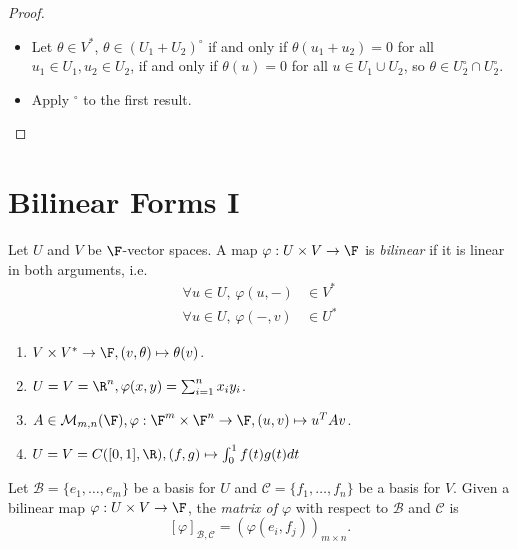 \documentclass[a4paper]{article}
\newcommand*{\ann}{\circ}
\newcommand*{\basis}{\mathcal}
\newcommand*{\M}{\mathcal{M}}
\theoremstyle{definition}
\begin{document}
\begin{proof}\leavevmode
  \begin{itemize}
  \item Let \(\theta \in V^*\), \(\theta \in (U_1+U_2)^\ann\) if and only if \(\theta(u_1+u_2) = 0\) for all \(u_1\in U_1, u_2 \in U_2\), if and only if \(\theta(u) = 0\) for all \(u \in U_1 \cup U_2\), so \(\theta\in U_2^\ann \cap U_2^\ann\).
  \item Apply \(^\ann\) to the first result.
  \end{itemize}
\end{proof}

\section{Bilinear Forms I}

\begin{definition}
  Let \(U\) and \(V\) be \(\F\)-vector spaces. A map \(\varphi: U \times V \to \F\) is \emph{bilinear} if it is linear in both arguments, i.e.
  \begin{align*}
    \forall u \in U, \, \varphi(u, -) &\in V^* \\
    \forall u \in U, \, \varphi(-, v) &\in U^*
  \end{align*}
\end{definition}

\begin{eg}\leavevmode
  \begin{enumerate}
  \item \(V \times V^* \to \F, (v, \theta) \mapsto \theta(v)\).
  \item \(U = V = \R^n, \varphi(x, y) = \sum_{i=1}^{n}x_iy_i\).
  \item \(A \in \M_{m,n}(\F), \varphi: \F^m \times \F^n \to \F, (u, v) \mapsto u^TAv\).
  \item \(U = V = C([0, 1], \R), (f, g) \mapsto \int_{0}^{1} f(t)g(t) dt \)
  \end{enumerate}
\end{eg}

\begin{definition}
  Let \(\basis B = \{e_1,\dots,e_m\}\) be a basis for \(U\) and \(\basis C = \{f_1,\dots,f_n\}\) be a basis for \(V\). Given a bilinear map \(\varphi: U \times V \to \F\), the \emph{matrix of \(\varphi\)} with respect to \(\basis B\) and \(\basis C\) is
  \[
    [\varphi]_{\basis B, \basis C} = \left( \varphi(e_i, f_j) \right)_{m \times n}.
  \]
\end{definition}
\end{document}
